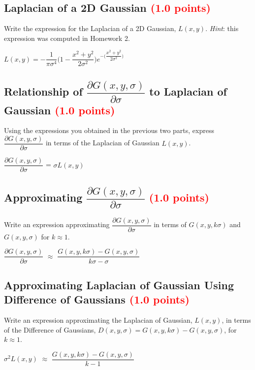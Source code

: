 \documentclass[answers]{exam}
\newcommand{\mypoints}[1]{\textcolor{red}{(#1 points)}}
\begin{document}
\subsection{Laplacian of a 2D Gaussian \mypoints{1.0}}
Write the expression for the Laplacian of a 2D Gaussian, $L(x, y)$. \emph{Hint}: this expression was computed in Homework 2.

\begin{solution}
$L(x,y) = -\dfrac{1}{\pi \sigma^4}\big(1 - \dfrac{x^2 + y^2}{2\sigma^2}\big) e^{-\big(\dfrac{x^2+y^2}{2\sigma^2}\big)} $
\end{solution}

\subsection{Relationship of $\dfrac{\partial G(x,y,\sigma)}{\partial \sigma}$ to Laplacian of Gaussian \mypoints{1.0}}
Using the expressions you obtained in the previous two parts, express $\dfrac{\partial G(x,y,\sigma)}{\partial \sigma}$ in terms of the Laplacian of Gaussian $L(x, y)$.
\begin{solution}
$\dfrac{\partial G(x,y,\sigma)}{\partial \sigma}$ = $\sigma L(x,y)$
\end{solution}

\subsection{Approximating $\dfrac{\partial G(x,y,\sigma)}{\partial \sigma}$ \mypoints{1.0}}
Write an expression approximating $\dfrac{\partial G(x,y,\sigma)}{\partial \sigma}$ in terms of $G(x,y,k\sigma)$ and $G(x,y,\sigma)$ for $k \approx 1$.
\begin{solution}
$\dfrac{\partial G(x,y,\sigma)}{\partial \sigma}$ $\approx$ $\dfrac{G(x,y,k\sigma) - G(x,y,\sigma)}{k\sigma - \sigma}$
\end{solution}

\subsection{Approximating Laplacian of Gaussian Using Difference of Gaussians \mypoints{1.0}}
Write an expression approximating the Laplacian of Gaussian, $L(x, y)$, in terms of the Difference of Gaussians, $D(x,y,\sigma)=G(x,y,k\sigma)-G(x,y,\sigma)$, for $k \approx 1$.
\begin{solution}
$\sigma^2L(x,y)$ $\approx$ $\dfrac{G(x,y,k\sigma) - G(x,y,\sigma)}{k - 1}$
\end{solution}
\end{document}
